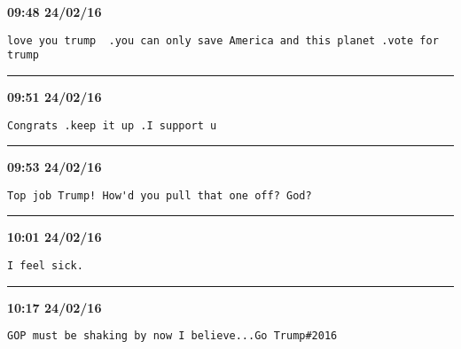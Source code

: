 \begin{adjustwidth}{0cm}{0cm}
\footnotesize \textbf{09:48 24/02/16}

\begin{lstlisting}[breaklines, breakatwhitespace, basicstyle=\small, frame=leftline]
love you trump  .you can only save America and this planet .vote for trump
\end{lstlisting}
\end{adjustwidth}

\hrule%

\begin{adjustwidth}{0cm}{0cm}
\footnotesize \textbf{09:51 24/02/16}

\begin{lstlisting}[breaklines, breakatwhitespace, basicstyle=\small, frame=leftline]
Congrats .keep it up .I support u
\end{lstlisting}
\end{adjustwidth}

\hrule%

\begin{adjustwidth}{0cm}{0cm}
\footnotesize \textbf{09:53 24/02/16}

\begin{lstlisting}[breaklines, breakatwhitespace, basicstyle=\small, frame=leftline]
Top job Trump! How'd you pull that one off? God?
\end{lstlisting}
\end{adjustwidth}

\hrule%

\begin{adjustwidth}{0cm}{0cm}
\footnotesize \textbf{10:01 24/02/16}

\begin{lstlisting}[breaklines, breakatwhitespace, basicstyle=\small, frame=leftline]
I feel sick.
\end{lstlisting}
\end{adjustwidth}

\hrule%

\begin{adjustwidth}{0cm}{0cm}
\footnotesize \textbf{10:17 24/02/16}

\begin{lstlisting}[breaklines, breakatwhitespace, basicstyle=\small, frame=leftline]
GOP must be shaking by now I believe...Go Trump#2016
\end{lstlisting}
\end{adjustwidth}

